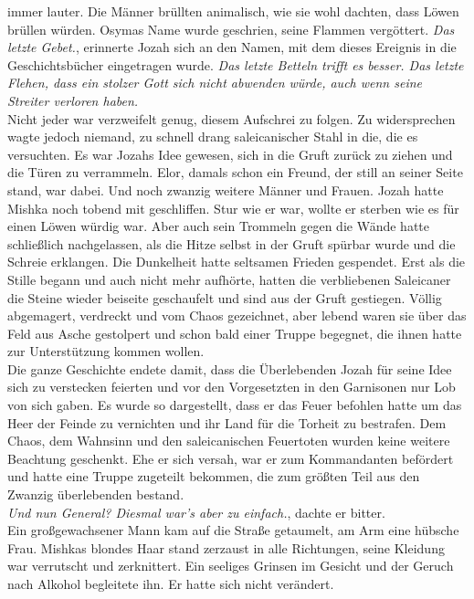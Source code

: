immer lauter. Die Männer brüllten animalisch, wie sie wohl dachten, dass Löwen brüllen würden. 
Osymas Name wurde geschrien, seine Flammen vergöttert. \textit{Das letzte Gebet.}, erinnerte Jozah 
sich an den Namen, mit dem dieses Ereignis in die Geschichtsbücher eingetragen wurde. \textit{Das 
letzte Betteln trifft es besser. Das letzte Flehen, dass ein stolzer Gott sich nicht abwenden 
würde, auch wenn seine Streiter verloren haben.}\\
Nicht jeder war verzweifelt genug, diesem Aufschrei zu folgen. Zu widersprechen wagte jedoch 
niemand, zu schnell drang saleicanischer Stahl in die, die es versuchten. Es war Jozahs Idee 
gewesen, sich in die Gruft zurück zu ziehen und die Türen zu verrammeln. Elor, damals schon ein 
Freund, der still an seiner Seite stand, war dabei. Und noch zwanzig weitere Männer und Frauen. 
Jozah hatte Mishka noch tobend mit geschliffen. Stur wie er war, wollte er sterben wie es für einen 
Löwen würdig war. Aber auch sein Trommeln gegen die Wände hatte schließlich nachgelassen, als die 
Hitze selbst in der Gruft spürbar wurde und die Schreie erklangen. Die Dunkelheit hatte seltsamen 
Frieden gespendet. Erst als die Stille begann und auch nicht mehr aufhörte, hatten die verbliebenen 
Saleicaner die Steine wieder beiseite geschaufelt und sind aus der Gruft gestiegen. Völlig 
abgemagert, verdreckt und vom Chaos gezeichnet, aber lebend waren sie über das Feld aus Asche 
gestolpert und schon bald einer Truppe begegnet, die ihnen hatte zur Unterstützung kommen wollen.\\
Die ganze Geschichte endete damit, dass die Überlebenden Jozah für seine Idee sich zu verstecken 
feierten und vor den Vorgesetzten in den Garnisonen nur Lob von sich gaben. Es wurde so 
dargestellt, dass er das Feuer befohlen hatte um das Heer der Feinde zu vernichten und ihr Land für 
die Torheit zu bestrafen. Dem Chaos, dem Wahnsinn und den saleicanischen Feuertoten wurden keine 
weitere Beachtung geschenkt. Ehe er sich versah, war er zum Kommandanten befördert und hatte eine 
Truppe zugeteilt bekommen, die zum größten Teil aus den Zwanzig überlebenden bestand.\\
\textit{Und nun General? Diesmal war's aber zu einfach.}, dachte er bitter.\\
Ein großgewachsener Mann kam auf die Straße getaumelt, am Arm eine hübsche Frau. Mishkas blondes 
Haar stand zerzaust in alle Richtungen, seine Kleidung war verrutscht und zerknittert. Ein seeliges 
Grinsen im Gesicht und der Geruch nach Alkohol begleitete ihn. Er hatte sich nicht verändert. 
